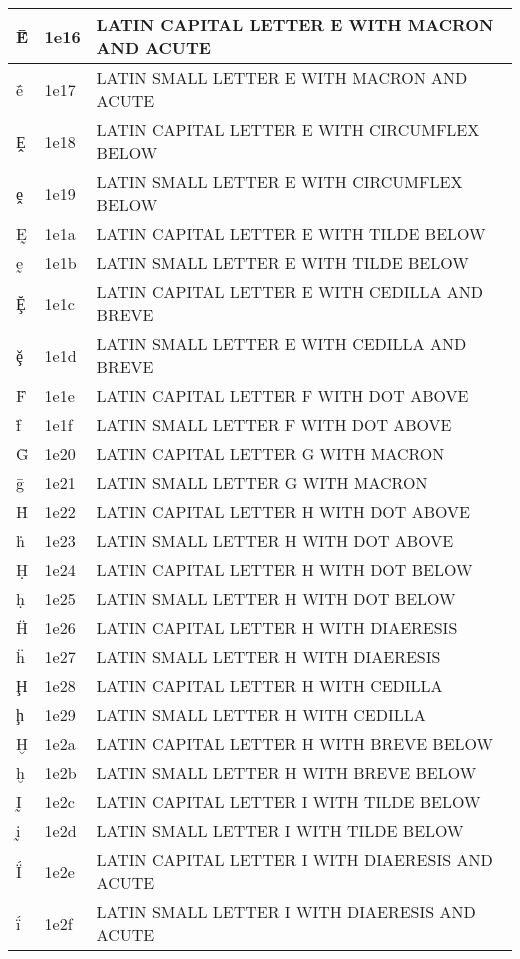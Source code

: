 \documentclass[12pt,letterpaper,openany]{book}
\begin{document}
\begin{center}
\begin{supertabular}{|m{0.25in}|m{0.5in}|m{4in}|}
			Ḗ & 1e16 & LATIN CAPITAL LETTER E WITH MACRON AND ACUTE\\\hline
			ḗ & 1e17 & LATIN SMALL LETTER E WITH MACRON AND ACUTE\\\hline
			Ḙ & 1e18 & LATIN CAPITAL LETTER E WITH CIRCUMFLEX BELOW\\\hline
			ḙ & 1e19 & LATIN SMALL LETTER E WITH CIRCUMFLEX BELOW\\\hline
			Ḛ & 1e1a & LATIN CAPITAL LETTER E WITH TILDE BELOW\\\hline
			ḛ & 1e1b & LATIN SMALL LETTER E WITH TILDE BELOW\\\hline
			Ḝ & 1e1c & LATIN CAPITAL LETTER E WITH CEDILLA AND BREVE\\\hline
			ḝ & 1e1d & LATIN SMALL LETTER E WITH CEDILLA AND BREVE\\\hline
			Ḟ & 1e1e & LATIN CAPITAL LETTER F WITH DOT ABOVE\\\hline
			ḟ & 1e1f & LATIN SMALL LETTER F WITH DOT ABOVE\\\hline
			Ḡ & 1e20 & LATIN CAPITAL LETTER G WITH MACRON\\\hline
			ḡ & 1e21 & LATIN SMALL LETTER G WITH MACRON\\\hline
			Ḣ & 1e22 & LATIN CAPITAL LETTER H WITH DOT ABOVE\\\hline
			ḣ & 1e23 & LATIN SMALL LETTER H WITH DOT ABOVE\\\hline
			Ḥ & 1e24 & LATIN CAPITAL LETTER H WITH DOT BELOW\\\hline
			ḥ & 1e25 & LATIN SMALL LETTER H WITH DOT BELOW\\\hline
			Ḧ & 1e26 & LATIN CAPITAL LETTER H WITH DIAERESIS\\\hline
			ḧ & 1e27 & LATIN SMALL LETTER H WITH DIAERESIS\\\hline
			Ḩ & 1e28 & LATIN CAPITAL LETTER H WITH CEDILLA\\\hline
			ḩ & 1e29 & LATIN SMALL LETTER H WITH CEDILLA\\\hline
			Ḫ & 1e2a & LATIN CAPITAL LETTER H WITH BREVE BELOW\\\hline
			ḫ & 1e2b & LATIN SMALL LETTER H WITH BREVE BELOW\\\hline
			Ḭ & 1e2c & LATIN CAPITAL LETTER I WITH TILDE BELOW\\\hline
			ḭ & 1e2d & LATIN SMALL LETTER I WITH TILDE BELOW\\\hline
			Ḯ & 1e2e & LATIN CAPITAL LETTER I WITH DIAERESIS AND ACUTE\\\hline
			ḯ & 1e2f & LATIN SMALL LETTER I WITH DIAERESIS AND ACUTE\\\hline

\end{supertabular}
\end{center}
\end{document}
